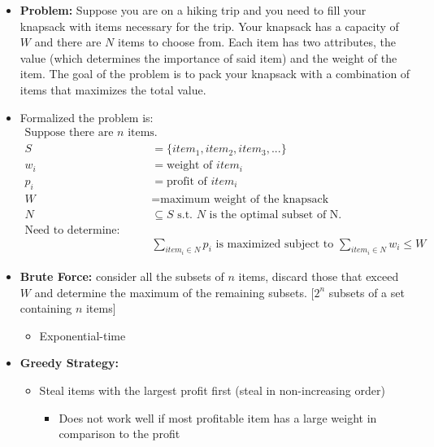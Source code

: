 
\usepackage{booktabs}
\usepackage{color, colortbl}
\usepackage{polynom}
\usepackage{tcolorbox}




	
	
	\begin{itemize}
		\item \textbf{Problem:} Suppose you are on a hiking trip and you need to fill your knapsack with items necessary for the trip. Your knapsack has a capacity of $W$ and there are $N$ items to choose from. Each item has two attributes, the value (which determines the importance of said item) and the weight of the item. The goal of the problem is to pack your knapsack with a combination of items that maximizes the total value.
		
		\item Formalized the problem is:
		\begin{align*}
			\mbox{Suppose there are } n \mbox{ items.} \\
			S &= \{item_1, item_2, item_3, ...\} \\
			w_i &= \mbox{weight of } item_i \\
			p_i &= \mbox{profit of } item_i \\
			W &= \mbox{maximum weight of the knapsack} \\
			N &\subseteq S \mbox{ s.t. } N \mbox{ is the optimal subset of N.}\\
			\mbox{Need to determine:} \\
			&\sum_{item_i \in N}p_i \mbox{ is maximized subject to } \sum_{item_i \in N} w_i \leq W
		\end{align*}
		\item \textbf{Brute Force:} consider all the subsets of $n$ items, discard those that exceed $W$ and determine the maximum of the remaining subsets. [$2^n$ subsets of a set containing $n$ items]
		\begin{itemize}
			\item Exponential-time
		\end{itemize}
		
		\item \textbf{Greedy Strategy:} 
		\begin{itemize}
			\item Steal items with the largest profit first (steal in non-increasing order)
			\begin{itemize}
				\item Does not work well if most profitable item has a large weight in comparison to the profit
			\end{itemize}
			

\end{itemize}
\end{itemize}
